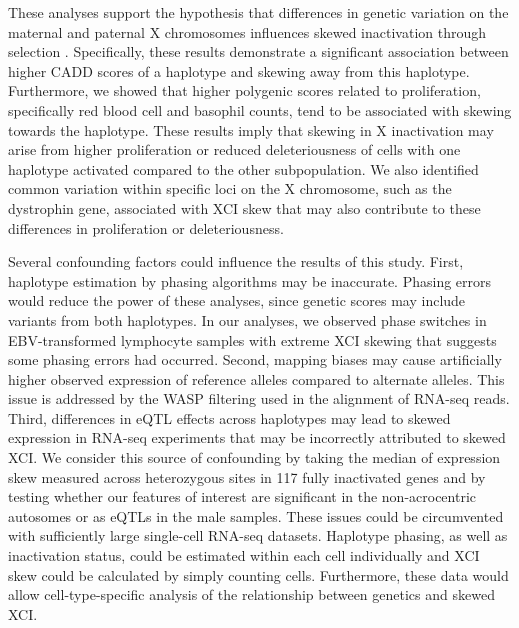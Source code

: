 These analyses support the hypothesis that differences in genetic variation on the maternal and paternal X chromosomes influences skewed inactivation through selection \cite{Brown1999-dc,Migeon1998-gc}. Specifically, these results demonstrate a significant association between higher CADD scores of a haplotype and skewing away from this haplotype. Furthermore, we showed that higher polygenic scores related to proliferation, specifically red blood cell and basophil counts, tend to be associated with skewing towards the haplotype. These results imply that skewing in X inactivation may arise from higher proliferation or reduced deleteriousness of cells with one haplotype activated compared to the other subpopulation. We also identified common variation within specific loci on the X chromosome, such as the dystrophin gene, associated with XCI skew that may also contribute to these differences in proliferation or deleteriousness.

Several confounding factors could influence the results of this study. First, haplotype estimation by phasing algorithms may be inaccurate. Phasing errors would reduce the power of these analyses, since genetic scores may include variants from both haplotypes. In our analyses, we observed phase switches in EBV-transformed lymphocyte samples with extreme XCI skewing that suggests some phasing errors had occurred. Second, mapping biases may cause artificially higher observed expression of reference alleles compared to alternate alleles. This issue is addressed by the WASP filtering \cite{Van_de_Geijn2015-oy} used in the alignment of RNA-seq reads. Third, differences in eQTL effects across haplotypes may lead to skewed expression in RNA-seq experiments that may be incorrectly attributed to skewed XCI. We consider this source of confounding by taking the median of expression skew measured across heterozygous sites in 117 fully inactivated genes and by testing whether our features of interest are significant in the non-acrocentric autosomes or as eQTLs in the male samples. These issues could be circumvented with sufficiently large single-cell RNA-seq datasets. Haplotype phasing, as well as inactivation status, could be estimated within each cell individually and XCI skew could be calculated by simply counting cells. Furthermore, these data would allow cell-type-specific analysis of the relationship between genetics and skewed XCI.  

